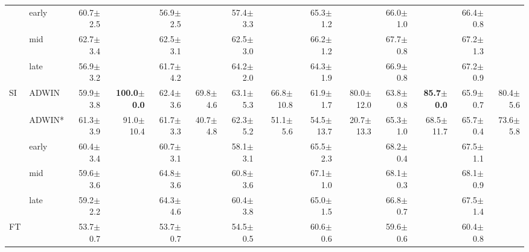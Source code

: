 \begin{tabular}{llrrrrrrrrrrrr}
 & early & 60.7\tiny{$\pm$2.5} &  & 56.9\tiny{$\pm$2.5} &  & 57.4\tiny{$\pm$3.3} &  & 65.3\tiny{$\pm$1.2} &  & 66.0\tiny{$\pm$1.0} &  & 66.4\tiny{$\pm$0.8} &  \\
 & mid & 62.7\tiny{$\pm$3.4} &  & 62.5\tiny{$\pm$3.1} &  & 62.5\tiny{$\pm$3.0} &  & 66.2\tiny{$\pm$1.2} &  & 67.7\tiny{$\pm$0.8} &  & 67.2\tiny{$\pm$1.3} &  \\
 & late & 56.9\tiny{$\pm$3.2} &  & 61.7\tiny{$\pm$4.2} &  & 64.2\tiny{$\pm$2.0} &  & 64.3\tiny{$\pm$1.9} &  & 66.9\tiny{$\pm$0.8} &  & 67.2\tiny{$\pm$0.9} &  \\
\midrule
\multirow[t]{5}{*}{SI} & ADWIN & 59.9\tiny{$\pm$3.8} & \textbf{100.0\tiny{$\pm$0.0}} & 62.4\tiny{$\pm$3.6} & 69.8\tiny{$\pm$4.6} & 63.1\tiny{$\pm$5.3} & 66.8\tiny{$\pm$10.8} & 61.9\tiny{$\pm$1.7} & 80.0\tiny{$\pm$12.0} & 63.8\tiny{$\pm$0.8} & \textbf{85.7\tiny{$\pm$0.0}} & 65.9\tiny{$\pm$0.7} & 80.4\tiny{$\pm$5.6} \\
 & ADWIN* & 61.3\tiny{$\pm$3.9} & 91.0\tiny{$\pm$10.4} & 61.7\tiny{$\pm$3.3} & 40.7\tiny{$\pm$4.8} & 62.3\tiny{$\pm$5.2} & 51.1\tiny{$\pm$5.6} & 54.5\tiny{$\pm$13.7} & 20.7\tiny{$\pm$13.3} & 65.3\tiny{$\pm$1.0} & 68.5\tiny{$\pm$11.7} & 65.7\tiny{$\pm$0.4} & 73.6\tiny{$\pm$5.8} \\
 & early & 60.4\tiny{$\pm$3.4} &  & 60.7\tiny{$\pm$3.1} &  & 58.1\tiny{$\pm$3.1} &  & 65.5\tiny{$\pm$2.3} &  & 68.2\tiny{$\pm$0.4} &  & 67.5\tiny{$\pm$1.1} &  \\
 & mid & 59.6\tiny{$\pm$3.6} &  & 64.8\tiny{$\pm$3.6} &  & 60.8\tiny{$\pm$3.6} &  & 67.1\tiny{$\pm$1.0} &  & 68.1\tiny{$\pm$0.3} &  & 68.1\tiny{$\pm$0.9} &  \\
 & late & 59.2\tiny{$\pm$2.2} &  & 64.3\tiny{$\pm$4.6} &  & 60.4\tiny{$\pm$3.8} &  & 65.0\tiny{$\pm$1.5} &  & 66.8\tiny{$\pm$0.7} &  & 67.5\tiny{$\pm$1.4} &  \\
\midrule
FT &  & 53.7\tiny{$\pm$0.7} &  & 53.7\tiny{$\pm$0.7} &  & 54.5\tiny{$\pm$0.5} &  & 60.6\tiny{$\pm$0.6} &  & 59.6\tiny{$\pm$0.6} &  & 60.4\tiny{$\pm$0.8} &  \\
\bottomrule
\end{tabular}
